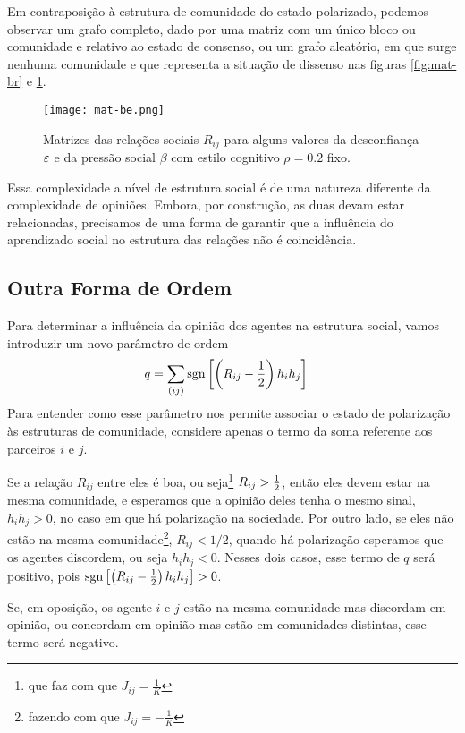 Em contraposição à estrutura de comunidade do estado polarizado, podemos observar um grafo completo, dado por uma matriz com um único bloco ou comunidade e relativo ao estado de consenso, ou um grafo aleatório, em que surge nenhuma comunidade e que representa a situação de dissenso nas figuras \ref{fig:mat-br} e \ref{fig:mat-be}.

\begin{figure}[b!]\label{fig:mat-be}
  \centering
  \texttt{[image: mat-be.png]}
  \caption{Matrizes das relações sociais $R_{ij}$ para alguns valores da desconfiança $\varepsilon$ e da pressão social $\beta$ com estilo cognitivo $\rho=0.2$ fixo.}
\end{figure}

Essa complexidade a nível de estrutura social é de uma natureza diferente da complexidade de opiniões.
Embora, por construção, as duas devam estar relacionadas, precisamos de uma forma de garantir que a influência do aprendizado social no estrutura das relações não é coincidência.

\subsection{Outra Forma de Ordem}

Para determinar a influência da opinião dos agentes na estrutura social, vamos introduzir um novo parâmetro de ordem
\begin{align}
    q & = \sum_{(ij)} \sgn\inbk{\inpr{R_{ij}-\half}h_ih_j} \label{eq:q-def}
\end{align}
Para entender como esse parâmetro nos permite associar o estado de polarização às estruturas de comunidade, considere apenas o termo da soma referente aos parceiros $i$ e $j$.

Se a relação $R_{ij}$ entre eles é boa, ou seja\footnote{que faz com que $J_{ij}=\frac{1}{K}$} $R_{ij} > {1 \over 2}$, então eles devem estar na mesma comunidade, e esperamos que a opinião deles tenha o mesmo sinal,  $h_ih_j>0$, no caso em que há polarização na sociedade.
Por outro lado, se eles não estão na mesma comunidade\footnote{fazendo com que $J_{ij}=-\frac{1}{K}$}, $R_{ij}<1/2$, quando há polarização esperamos que os agentes discordem, ou seja $h_ih_j < 0$.
Nesses dois casos, esse termo de $q$ será positivo, pois $\mathrm{sgn} \left[ \left( R_{ij}-{1 \over 2} \right) h_ih_j \right]>0$.

Se, em oposição, os agente $i$ e $j$ estão na mesma comunidade mas discordam em opinião, ou concordam em opinião mas estão em comunidades distintas, esse termo será negativo.

